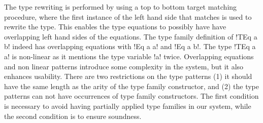 \documentclass[format=sigplan,manuscript,review,screen,nonacm,margin=1in]{acmart}
\begin{document}
The type rewriting is performed by using a top to bottom target matching procedure,
where the first instance of the left hand side that matches is used to rewrite the type.
This enables the type equations to possibly have have overlapping left hand sides of the equations.  
The type family definition of !TEq a b! indeed has overlapping equations with !Eq a a! and !Eq a b!.
The type !TEq a a! is non-linear as it mentions the type variable !a! twice.
Overlapping equations and non linear patterns introduce some complexity in the system, but it also
enhances usability. There are two restrictions on the type patterns
(1) it should  have the same length as the arity of the type family constructor, and
(2) the type patterns can not have occurrences of type family constructors.
The first condition is necessary to avoid having partially applied type families in our system,
while the second condition is to ensure soundness.
\end{document}
